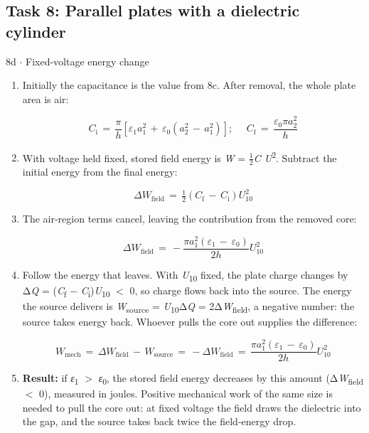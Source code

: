 \documentclass[11pt]{article}
\begin{document}
\begin{keepsection}\subsection{Task 8: Parallel plates with a dielectric cylinder}

\begin{workedbox}{8d \ensuremath{\cdot} Fixed-voltage energy change}
\begin{enumerate}
\item {}
Initially the capacitance is the value from 8c. After removal, the whole plate area is air:

\begin{equation*}{C}_{\mathrm{i}}\, =\, \dfrac{{π}}{{h}}[{ε}_{1}{a}_{1}^{2}\, +\, {ε}_{0}({a}_{2}^{2}\, -\, {a}_{1}^{2})];\, \quad \, {C}_{\mathrm{f}}\, =\, \dfrac{{ε}_{0}π{a}_{2}^{2}}{{h}}\end{equation*}
\item {}
With voltage held fixed, stored field energy is \textit{W} = \ensuremath{\tfrac12}\textit{C U}\textsuperscript{2}. Subtract the initial energy from the final energy:

\begin{equation*}Δ{W}_{\text{field}}\, =\, \tfrac{1}{2}({C}_{\mathrm{f}}\, -\, {C}_{\mathrm{i}}){U}_{10}^{2}\end{equation*}
\item {}
The air-region terms cancel, leaving the contribution from the removed core:

\begin{equation*}Δ{W}_{\text{field}}\, =\, -\dfrac{{πa}_{1}^{2}({ε}_{1}\, -\, {ε}_{0})}{2{h}}{U}_{10}^{2}\end{equation*}
\item {}
Follow the energy that leaves. With \textit{U}\textsubscript{10} fixed, the plate charge changes by Δ\textit{Q} = (\textit{C}\textsubscript{f} \ensuremath{-} \textit{C}\textsubscript{i})\textit{U}\textsubscript{10} \ensuremath{<} 0, so charge flows back into the source. The energy the source delivers is \textit{W}\textsubscript{source} = \textit{U}\textsubscript{10}Δ\textit{Q} = 2Δ\textit{W}\textsubscript{field}, a negative number: the source takes energy back. Whoever pulls the core out supplies the difference:

\begin{equation*}{W}_{\text{mech}}\, =\, Δ{W}_{\text{field}}\, -\, {W}_{\text{source}}\, =\, -Δ{W}_{\text{field}}\, =\, \dfrac{π{a}_{1}^{2}(ε_{1}\, -\, ε_{0})}{2{h}}{U}_{10}^{2}\end{equation*}
\item {}
\textbf{Result:} if \textit{ε}\textsubscript{1} \ensuremath{>} \textit{ε}\textsubscript{0}, the stored field energy decreases by this amount (Δ\textit{W}\textsubscript{field} \ensuremath{<} 0), measured in joules. Positive mechanical work of the same size is needed to pull the core out: at fixed voltage the field draws the dielectric into the gap, and the source takes back twice the field-energy drop.


\end{enumerate}
\end{workedbox}
\end{keepsection}
\end{document}
